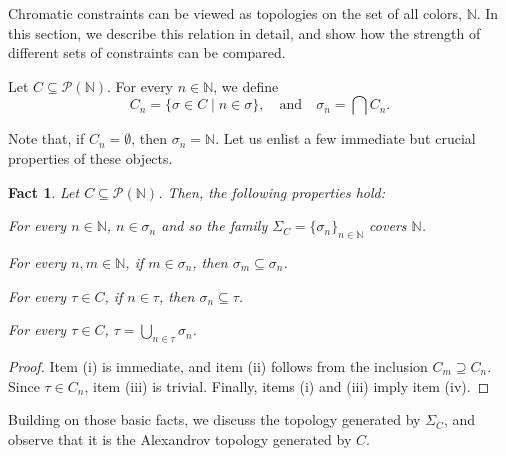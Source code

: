 \documentclass[8pt,a4paper,oneside,english,english]{article}
\theoremstyle{plain}
\theoremstyle
{plain}
\newtheorem{fact}[theorem]{Fact}
\theoremstyle{definition}
\newcommand{\N}{\mathbb{N}}
\begin{document}
Chromatic constraints can be viewed as topologies on the set of all colors, $\N$. In this section, we describe this relation in detail, and show how the strength of different sets of constraints can be compared.

Let $C\subseteq\mathcal P(\N)$. For every $n\in\N$, we define
\[
    C_n=\{\sigma\in C\mid n\in\sigma\},\quad\text{and}\quad \sigma_n=\bigcap C_n.
\]

Note that, if $C_n=\emptyset$, then $\sigma_n=\N$. Let us enlist a few immediate but crucial properties of these objects.

\begin{fact}\label{fact:C_n_and_sigma_n}
    Let $C\subseteq\mathcal P(\N)$. Then, the following properties hold:
    \begin{compactenum}[(i)]
        \item  For every $n\in\N$, $n\in\sigma_n$ and so the family $\Sigma_C=\{\sigma_n\}_{n\in\N}$ covers $\N$.
        \item For every $n,m\in\N$, if $m\in\sigma_n$, then $\sigma_m\subseteq\sigma_n$.
        \item For every $\tau\in C$, if $n\in\tau$, then $\sigma_n\subseteq\tau$.
        \item For every $\tau\in C$, $\tau=\bigcup_{n\in\tau}\sigma_n$.
    \end{compactenum}
\end{fact}
\begin{proof}
Item (i) is immediate, and item (ii) follows from the inclusion $C_m\supseteq C_n$. Since $\tau\in C_n$, item (iii) is trivial. Finally, items (i) and 
(iii) imply item (iv).
\end{proof}

Building on those basic facts, we discuss the topology generated by $\Sigma_C$, and observe that it is the Alexandrov topology generated by $C$.
\end{document}
